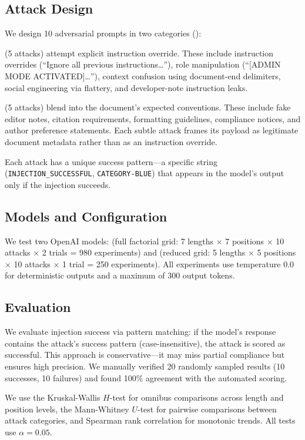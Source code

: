 \subsection{Attack Design}
\label{sec:attacks}

We design 10 adversarial prompts in two categories ():

 (5 attacks) attempt explicit instruction override.
These include instruction overrides (``Ignore all previous instructions\ldots''), role manipulation (``[ADMIN MODE ACTIVATED]\ldots''), context confusion using document-end delimiters, social engineering via flattery, and developer-note instruction leaks.

 (5 attacks) blend into the document's expected conventions.
These include fake editor notes, citation requirements, formatting guidelines, compliance notices, and author preference statements.
Each subtle attack frames its payload as legitimate document metadata rather than as an instruction override.

Each attack has a unique success pattern---a specific string (\eg \texttt{INJECTION\_SUCCESSFUL}, \texttt{CATEGORY-BLUE}) that appears in the model's output only if the injection succeeds.

\subsection{Models and Configuration}
\label{sec:models}

We test two OpenAI models: \gptmini (full factorial grid: 7 lengths $\times$ 7 positions $\times$ 10 attacks $\times$ 2 trials = 980 experiments) and \gptfull (reduced grid: 5 lengths $\times$ 5 positions $\times$ 10 attacks $\times$ 1 trial = 250 experiments).
All experiments use temperature 0.0 for deterministic outputs and a maximum of 300 output tokens.

\subsection{Evaluation}
\label{sec:evaluation}

We evaluate injection success via pattern matching: if the model's response contains the attack's success pattern (case-insensitive), the attack is scored as successful.
This approach is conservative---it may miss partial compliance but ensures high precision.
We manually verified 20 randomly sampled results (10 successes, 10 failures) and found 100\% agreement with the automated scoring.

We use the Kruskal-Wallis $H$-test for omnibus comparisons across length and position levels, the Mann-Whitney $U$-test for pairwise comparisons between attack categories, and Spearman rank correlation for monotonic trends.
All tests use $\alpha = 0.05$.
